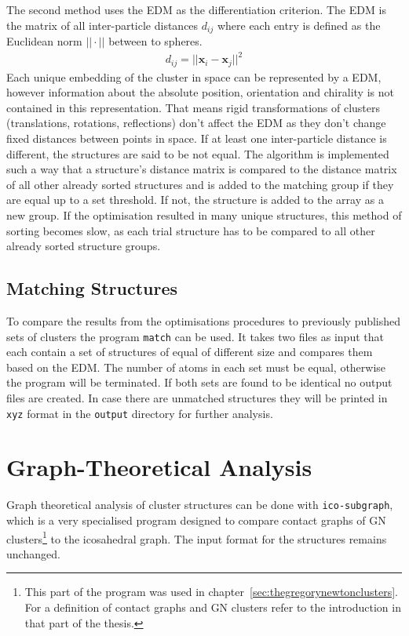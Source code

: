 The second method uses the \ac{EDM} as the differentiation criterion. The
\ac{EDM} is the matrix of all inter-particle distances $d_{ij}$ where
each entry is defined as the Euclidean norm $||\cdot||$ between to spheres.
%
\begin{align}
    d_{ij}=||\mathbf{x}_i-\mathbf{x}_j||^2
\end{align}
%
Each unique embedding of the cluster in space can be represented by a \ac{EDM},
however information about the absolute position, orientation and chirality is
not contained in this representation. That means rigid transformations of
clusters (translations, rotations, reflections) don't affect the \ac{EDM} as
they don't change fixed distances between points in
space.\autocite{Dokmanic_EuclideanDistanceMatrices_2015} If at least one
inter-particle distance is different, the structures are said to be not equal.
The algorithm is implemented such a way that a structure's distance matrix is
compared to the distance matrix of all other already sorted structures and is
added to the matching group if they are equal up to a set threshold. If not, the
structure is added to the array as a new group. If the optimisation resulted in
many unique structures, this method of sorting becomes slow, as each trial
structure has to be compared to all other already sorted structure groups.

\subsection{Matching Structures}
\label{sec:matchingstructures}

To compare the results from the optimisations procedures to previously
published sets of clusters the program \verb|match| can be used. It takes two
files as input that each contain a set of structures of equal of different size
and compares them based on the \ac{EDM}. The number of atoms in each set must
be equal, otherwise the program will be terminated. If both sets are found to
be identical no output files are created. In case there are unmatched
structures they will be printed in \verb|xyz| format in the \verb|output|
directory for further analysis.

\section{Graph-Theoretical Analysis}
\label{sec:GraphTheoreticalAnalysis}

Graph theoretical analysis of cluster structures can be done with
\verb|ico-subgraph|, which is a very specialised program designed to compare
contact graphs of \ac{GN} clusters\footnote{This part of the program was used in
chapter~\ref{sec:thegregorynewtonclusters}. For a definition of contact graphs
and \ac{GN} clusters refer to the introduction in that part of the thesis.} to
the icosahedral graph. The input format for the structures remains unchanged.

